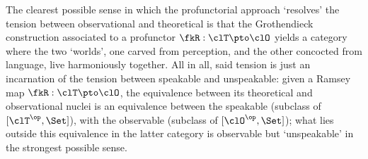\begin{remark}\label{resoudre_la_tension}
	The clearest possible sense in which the profunctorial approach `resolves' the tension between observational and theoretical is that the Gro\-then\-dieck construction associated to a profunctor $\fkR : \clT \pto \clO$ yields a category where the two `worlds', one carved from perception, and the other concocted from language, live harmoniously together. All in all, said tension is just an incarnation of the tension between speakable and unspeakable: given a Ramsey map $\fkR : \clT \pto \clO$, the equivalence between its theoretical and observational nuclei is an equivalence between the speakable (subclass of $[\clT^\op,\Set]$), with the observable (subclass of $[\clO^\op,\Set]$); what lies outside this equivalence in the latter category is observable but `unspeakable' in the strongest possible sense.
\end{remark}
